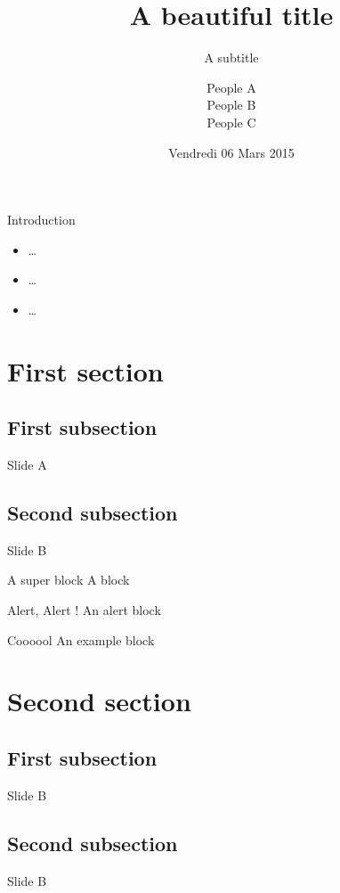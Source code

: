 \documentclass{beamer}
\title[] %
{A beautiful title}
\subtitle{A subtitle}
\author[
People A\\
People B\\
People C
] %
{People A\\ 
People B\\ 
People C}
\institute[] 
{
  Universit\'e Toulouse III -- Paul Sabatier \\
  M1 Informatique -- Développement Logiciel 
  \vspace{-10px}
}
\date[ ~ ~ ~ 05 / 03 / 2015] %
{Vendredi 06 Mars 2015}
\begin{document}
	\begin{frame}
		\titlepage
	\end{frame}
	\begin{frame}
		\tableofcontents
	\end{frame}
	\begin{frame}{Introduction}
		\begin{itemize}
			\item \ldots 
			\item \ldots 
			\item \ldots
		\end{itemize}
	\end{frame}
	\section{First section}
	\subsection{First subsection}
	\begin{frame}{Slide A}
		
	\end{frame}
	\subsection{Second subsection}

	\begin{frame}{Slide B}
		\begin{block}{A super block}
			A block	
		\end{block}
		\begin{alertblock}{Alert, Alert !}
			An alert block
		\end{alertblock}

		\begin{exampleblock}{Coooool}
			An example block	
		\end{exampleblock}
	\end{frame}
	\section{Second section}
	\subsection{First subsection}
	\begin{frame}{Slide B}
	\end{frame}
	\subsection{Second subsection}
	\begin{frame}{Slide B}
	\end{frame}
\end{document}
